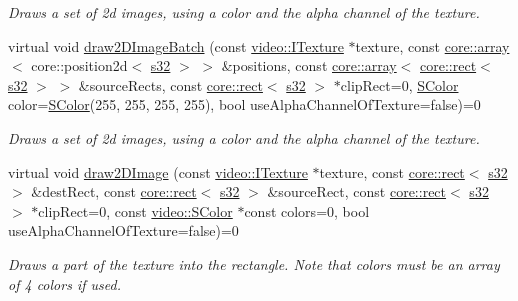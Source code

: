 \begin{DoxyCompactItemize}
\begin{DoxyCompactList}\small\item\em Draws a set of 2d images, using a color and the alpha channel of the texture. \end{DoxyCompactList}\item 
virtual void \hyperlink{classirr_1_1video_1_1IVideoDriver_a6485a684c4dfa4d0f94d0edfb46439a6}{draw2\+D\+Image\+Batch} (const \hyperlink{classirr_1_1video_1_1ITexture}{video\+::\+I\+Texture} $\ast$texture, const \hyperlink{classirr_1_1core_1_1array}{core\+::array}$<$ core\+::position2d$<$ \hyperlink{namespaceirr_ac66849b7a6ed16e30ebede579f9b47c6}{s32} $>$ $>$ \&positions, const \hyperlink{classirr_1_1core_1_1array}{core\+::array}$<$ \hyperlink{classirr_1_1core_1_1rect}{core\+::rect}$<$ \hyperlink{namespaceirr_ac66849b7a6ed16e30ebede579f9b47c6}{s32} $>$ $>$ \&source\+Rects, const \hyperlink{classirr_1_1core_1_1rect}{core\+::rect}$<$ \hyperlink{namespaceirr_ac66849b7a6ed16e30ebede579f9b47c6}{s32} $>$ $\ast$clip\+Rect=0, \hyperlink{classirr_1_1video_1_1SColor}{S\+Color} color=\hyperlink{classirr_1_1video_1_1SColor}{S\+Color}(255, 255, 255, 255), bool use\+Alpha\+Channel\+Of\+Texture=false)=0
\begin{DoxyCompactList}\small\item\em Draws a set of 2d images, using a color and the alpha channel of the texture. \end{DoxyCompactList}\item 
virtual void \hyperlink{classirr_1_1video_1_1IVideoDriver_a49258725a8c36dbb22d073acf7927354}{draw2\+D\+Image} (const \hyperlink{classirr_1_1video_1_1ITexture}{video\+::\+I\+Texture} $\ast$texture, const \hyperlink{classirr_1_1core_1_1rect}{core\+::rect}$<$ \hyperlink{namespaceirr_ac66849b7a6ed16e30ebede579f9b47c6}{s32} $>$ \&dest\+Rect, const \hyperlink{classirr_1_1core_1_1rect}{core\+::rect}$<$ \hyperlink{namespaceirr_ac66849b7a6ed16e30ebede579f9b47c6}{s32} $>$ \&source\+Rect, const \hyperlink{classirr_1_1core_1_1rect}{core\+::rect}$<$ \hyperlink{namespaceirr_ac66849b7a6ed16e30ebede579f9b47c6}{s32} $>$ $\ast$clip\+Rect=0, const \hyperlink{classirr_1_1video_1_1SColor}{video\+::\+S\+Color} $\ast$const colors=0, bool use\+Alpha\+Channel\+Of\+Texture=false)=0
\begin{DoxyCompactList}\small\item\em Draws a part of the texture into the rectangle. Note that colors must be an array of 4 colors if used. \end{DoxyCompactList}\item 

\end{DoxyCompactItemize}
